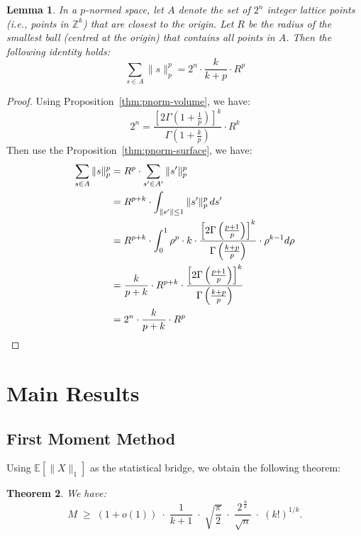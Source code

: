\documentclass[11pt]{amsart}
\theoremstyle{plain}
\newtheorem{theorem}{Theorem}[section]
\newtheorem{lemma}[theorem]{Lemma}
\theoremstyle{definition}
\numberwithin{equation}{section}
\begin{document}
   \begin{lemma}\label{lem:pnorm}
   In a $p$-normed space, let $A$ denote the set of $2^n$ integer lattice points (i.e., points in $\mathbb{Z}^k$) that are closest to the origin. Let $R$ be the radius of the smallest ball (centred at the origin) that contains all points in $A$. Then the following identity holds:
   \[
   \sum_{s\in A}{\|s\|_p^p}=2^n\cdot \frac{k}{k+p}\cdot R^p
   \]
   \end{lemma}

   \begin{proof}
   Using Proposition~\ref{thm:pnorm-volume}, we have:
   \[
   2^n = \frac{\left[2\Gamma\left(1+\frac{1}{p}\right)\right]^k}{\Gamma\left(1+\frac{k}{p}\right)} \cdot R^{k}
   \]
   Then use the Proposition~\ref{thm:pnorm-surface}, we have:
   \begin{align*}
   \sum_{s\in A}{\|s\|_p^p} &= R^p\cdot \sum_{s'\in A'}{\|s'\|_p^p} \\
   &= R^{p+k}\cdot\int_{\|s'\|\le1}\|s'\|_p^p\,ds' \\
   &= R^{p+k}\cdot \int_{0}^{1}\rho^p\cdot k\cdot\frac{\left[2\Gamma\left(\frac{p+1}{p}\right)\right]^k}{\Gamma\left( \frac{k+p}{p}\right)}\cdot\rho^{k-1}d\rho \\
   &= \frac{k}{p+k}\cdot R^{p+k}\cdot \frac{\left[2\Gamma\left(\frac{p+1}{p}\right)\right]^k}{\Gamma\left( \frac{k+p}{p}\right)} \\
   &= 2^n\cdot \frac{k}{p+k}\cdot R^p \qedhere
   \end{align*}
   \end{proof}

\section{Main Results}

\subsection{First Moment Method}
Using $\mathbb{E}[\|X\|_1]$ as the statistical bridge, we obtain the following theorem:
\begin{theorem}\label{thm:first}
We have:
\[
M \;\ge\; (1+o(1))\;\cdot\;\frac{1}{k+1}\;\cdot\;\sqrt{\frac{\pi}{2}}\;\cdot\;\frac{2^{\,\tfrac{n}{k}}}{\sqrt{n}}\;\cdot\;(k!)^{1/k}.
\]
\end{theorem}
\end{document}
